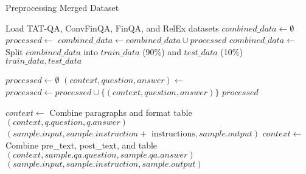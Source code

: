 \documentclass[logo,msc]{infthesis}           %
\begin{document}
\begin{algorithm}[H]
\caption{Preprocessing Merged Dataset}
\label{alg:preprocess_financial}
\begin{algorithmic}[1]
    \State Load TAT-QA, ConvFinQA, FinQA, and RelEx datasets
    \State $combined\_data \gets \emptyset$
        \State $processed \gets $ 
        \State $combined\_data \gets combined\_data \cup processed$
    \EndFor
    \State $combined\_data \gets$ 
    \State Split $combined\_data$ into $train\_data$ (90\%) and $test\_data$ (10\%)
    \State \Return $train\_data, test\_data$
\EndProcedure

    \State $processed \gets \emptyset$
        \State $(context, question, answer) \gets$ 
        \State $processed \gets processed \cup \{(context, question, answer)\}$
    \EndFor
    \State \Return $processed$
\EndProcedure

        \State $context \gets$ Combine paragraphs and format table
            \State \Return $(context, q.question, q.answer)$
        \EndFor
        \State \Return $(sample.input, sample.instruction + \text{ instructions}, sample.output)$
        \State $context \gets$ Combine pre\_text, post\_text, and table
        \State \Return $(context, sample.qa.question, sample.qa.answer)$
        \State \Return $(sample.input, sample.instruction, sample.output)$
    \EndIf
\EndProcedure
\end{algorithmic}
\end{algorithm}
\end{document}
